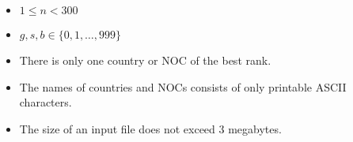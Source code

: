 \begin{itemize}
\tightlist
\item $1\le n< 300$
\item $g, s, b \in \{0,1,\dots,999\}$
\item There is only one country or NOC of the best rank.
\item The names of countries and NOCs consists of only printable ASCII characters.
\item The size of an input file does not exceed 3 megabytes.
\end{itemize}
